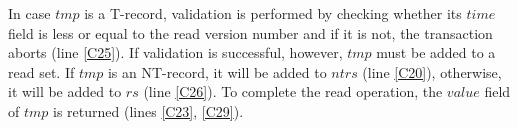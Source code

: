 \documentclass[11pt,letterpaper]{article}
\begin{document}
In case $\mathit{tmp}$ is a T-record, validation is performed by checking 
whether its $ time$ field is less or 
equal to the read version number and if it is not, the transaction aborts 
(line \ref{C25}). If validation is 
successful, however, $\mathit{tmp}$ must be added to a read set. 
If $\mathit{tmp}$ is an NT-record, it will be added 
to $\mathit{ntrs}$ (line \ref{C20}), otherwise, it will be added to 
$\mathit{rs}$ (line \ref{C26}). To complete the read 
operation, the $\mathit{value}$ field of $\mathit{tmp}$ is returned 
(lines \ref{C23}, \ref{C29}).

\begin{figure} %
\end{figure}
\end{document}
